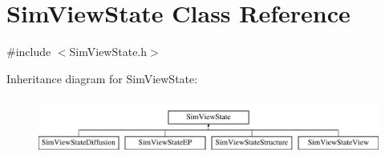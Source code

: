 \hypertarget{class_sim_view_state}{\section{Sim\+View\+State Class Reference}
\label{class_sim_view_state}
}


{\ttfamily \#include $<$Sim\+View\+State.\+h$>$}

Inheritance diagram for Sim\+View\+State\+:\begin{figure}[H]
\begin{center}
\leavevmode
\includegraphics[height=1.891892cm]{class_sim_view_state}
\end{center}
\end{figure}
